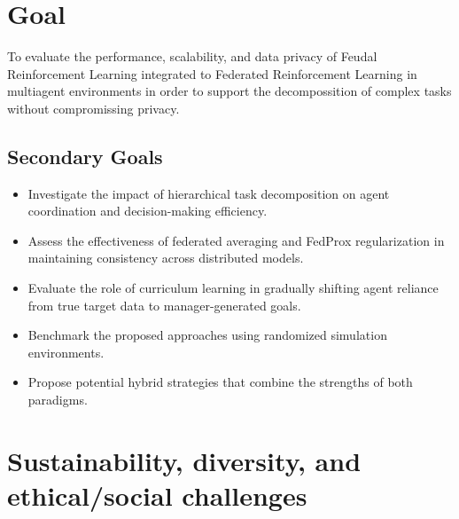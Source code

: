 \documentclass[12pt,a4paper,twoside,openany]{book}
\begin{document}
\section{Goal}

To evaluate the performance, scalability, and data privacy of Feudal Reinforcement Learning integrated to Federated Reinforcement Learning in multiagent environments in order to support the decompossition of complex tasks without compromissing privacy.

\subsection*{Secondary Goals}

\begin{itemize}
    \item Investigate the impact of hierarchical task decomposition on agent coordination and decision-making efficiency.
    \item Assess the effectiveness of federated averaging and FedProx regularization in maintaining consistency across distributed models.
    \item Evaluate the role of curriculum learning in gradually shifting agent reliance from true target data to manager-generated goals.
    \item Benchmark the proposed approaches using randomized simulation environments.
    \item Propose potential hybrid strategies that combine the strengths of both paradigms.
\end{itemize}

\section{Sustainability, diversity, and ethical/social challenges}
\end{document}
